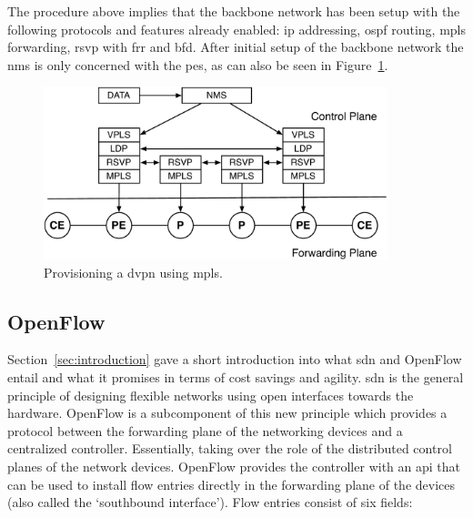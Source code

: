 The procedure above implies that the backbone network has been setup with the following protocols and features already enabled: \ac{ip} addressing, \ac{ospf} routing, \ac{mpls} forwarding, \ac{rsvp} with \ac{frr} and \ac{bfd}. After initial setup of the backbone network the \ac{nms} is only concerned with the \acp{pe}, as can also be seen in Figure~\ref{fig:nms-stack}.

\begin{figure}[!h]
	\centering
	\includegraphics[width=10cm]{./includes/nms-stack.pdf}
	\caption{Provisioning a \ac{dvpn} using \ac{mpls}.}
	\label{fig:nms-stack}
\end{figure}



\subsection{OpenFlow} %
\label{sub:openflow}

Section~\ref{sec:introduction} gave a short introduction into what \ac{sdn} and OpenFlow entail and what it promises in terms of cost savings and agility. \acl{sdn} is the general principle of designing flexible networks using open interfaces towards the hardware. OpenFlow is a subcomponent of this new principle which provides a protocol between the forwarding plane of the networking devices and a centralized controller. Essentially, taking over the role of the distributed control planes of the network devices. OpenFlow provides the controller with an \ac{api} that can be used to install flow entries directly in the forwarding plane of the devices (also called the `southbound interface'). Flow entries consist of six fields:

